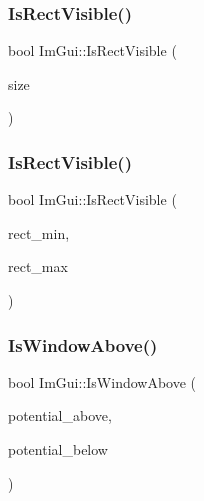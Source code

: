 \subsubsection{\texorpdfstring{Is\+Rect\+Visible()}{IsRectVisible()}\hspace{0.1cm}{\footnotesize\ttfamily [1/2]}}
{\footnotesize\ttfamily bool Im\+Gui\+::\+Is\+Rect\+Visible (\begin{DoxyParamCaption}\item[{const \hyperlink{structImVec2}{Im\+Vec2} \&}]{size }\end{DoxyParamCaption})}

\mbox{\label{namespaceImGui_a5aca7e6939e07caaca489aa8c776fd81}} 
\subsubsection{\texorpdfstring{Is\+Rect\+Visible()}{IsRectVisible()}\hspace{0.1cm}{\footnotesize\ttfamily [2/2]}}
{\footnotesize\ttfamily bool Im\+Gui\+::\+Is\+Rect\+Visible (\begin{DoxyParamCaption}\item[{const \hyperlink{structImVec2}{Im\+Vec2} \&}]{rect\+\_\+min,  }\item[{const \hyperlink{structImVec2}{Im\+Vec2} \&}]{rect\+\_\+max }\end{DoxyParamCaption})}

\mbox{\label{namespaceImGui_ac5dd091c08f9d923c8f849353fe359bf}} 
\subsubsection{\texorpdfstring{Is\+Window\+Above()}{IsWindowAbove()}}
{\footnotesize\ttfamily bool Im\+Gui\+::\+Is\+Window\+Above (\begin{DoxyParamCaption}\item[{\hyperlink{structImGuiWindow}{Im\+Gui\+Window} $\ast$}]{potential\+\_\+above,  }\item[{\hyperlink{structImGuiWindow}{Im\+Gui\+Window} $\ast$}]{potential\+\_\+below }\end{DoxyParamCaption})}

